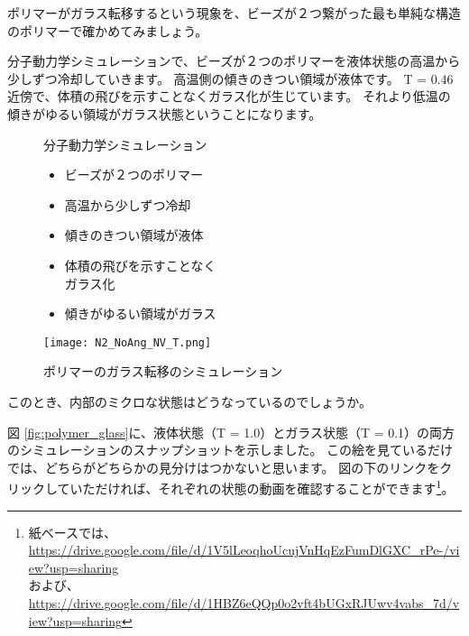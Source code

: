\documentclass[uplatex,dvipdfmx,a4paper,11pt]{jsarticle}
\begin{document}
ポリマーがガラス転移するという現象を、ビーズが２つ繋がった最も単純な構造のポリマーで確かめてみましょう。

分子動力学シミュレーションで、ビーズが２つのポリマーを液体状態の高温から少しずつ冷却していきます。
高温側の傾きのきつい領域が液体です。
T = 0.46近傍で、体積の飛びを示すことなくガラス化が生じています。
それより低温の傾きがゆるい領域がガラス状態ということになります。
\begin{figure}[htb]
	\begin{center}
		\begin{minipage}{0.45\textwidth}
			\large
			\begin{itembox}[l]{分子動力学シミュレーション}
				\begin{itemize}
					\item ビーズが２つのポリマー
					\item 高温から少しずつ冷却
					\item 傾きのきつい領域が液体
					\item 体積の飛びを示すことなく\\ガラス化
					\item 傾きがゆるい領域がガラス
				\end{itemize}
			\end{itembox}	
		\end{minipage}
		\begin{minipage}{0.45\textwidth}
			\begin{center}
			\texttt{[image: N2\_NoAng\_NV\_T.png]}
			\end{center}
		\end{minipage}
		\caption{ポリマーのガラス転移のシミュレーション}
		\label{fig:polymer_sim}
	\end{center}
\end{figure}

このとき、内部のミクロな状態はどうなっているのでしょうか。

図 \ref{fig:polymer_glass}に、液体状態（T = 1.0）とガラス状態（T = 0.1）の両方のシミュレーションのスナップショットを示しました。
この絵を見ているだけでは、どちらがどちらかの見分けはつかないと思います。
図の下のリンクをクリックしていただければ、それぞれの状態の動画を確認することができます\footnote{
	紙ベースでは、\url{https://drive.google.com/file/d/1V5lLeoqhoUcujVnHqEzFumDlGXC_rPe-/view?usp=sharing}\\
	および、\url{https://drive.google.com/file/d/1HBZ6eQQp0o2vft4bUGxRJUwv4vabs_7d/view?usp=sharing}
}。
\end{document}
